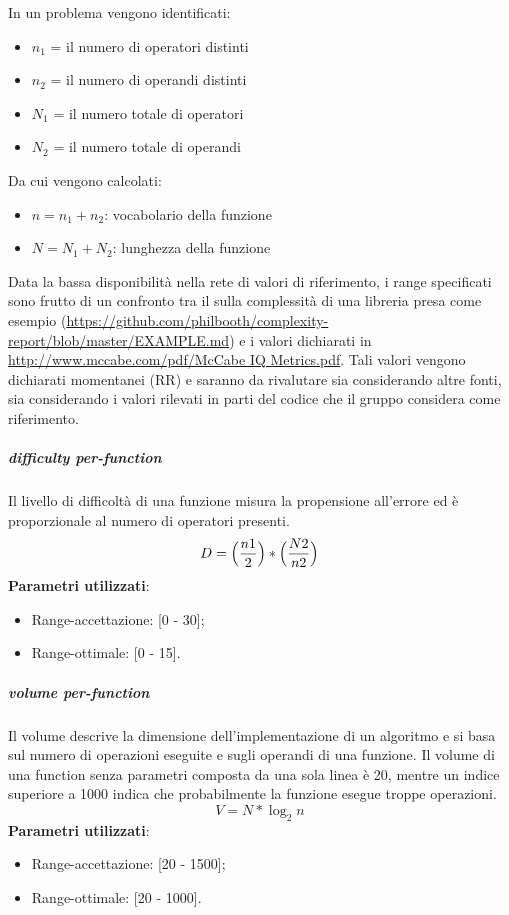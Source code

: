 			In un problema vengono identificati:
			\begin{itemize}
				\item $n_1$ = il numero di operatori distinti
				\item $n_2$ = il numero di operandi distinti
				\item $N_1$ = il numero totale di operatori
				\item $N_2$ = il numero totale di operandi
			\end{itemize}
			Da cui vengono calcolati:
				\begin{itemize}
				\item $n = n_1 + n_2$: vocabolario della funzione
				\item $N = N_1 + N_2$: lunghezza della funzione
			\end{itemize}
			Data la bassa disponibilità nella rete di valori di riferimento, i range specificati sono frutto di un confronto tra il  sulla complessità di una libreria  presa come esempio (\url{https://github.com/philbooth/complexity-report/blob/master/EXAMPLE.md}) e i valori dichiarati in \url{http://www.mccabe.com/pdf/McCabe IQ Metrics.pdf}. Tali valori vengono dichiarati momentanei (RR) e saranno da rivalutare sia considerando altre fonti, sia considerando i valori rilevati in parti del codice che il gruppo considera come riferimento. %

			
			\subparagraph{ difficulty per-function}
			Il livello di difficoltà di una funzione misura la propensione all'errore ed è proporzionale al numero di operatori presenti. 
			\[
			 D = \Bigl( \frac{n1}{2} \Bigr)  * \Bigl(  \frac{N2}{n2} \Bigr)
			 \]
			\textbf{Parametri utilizzati}:
			\begin{itemize}
				\item Range-accettazione: [0 - 30];
				\item Range-ottimale: [0 - 15].
			\end{itemize}
			
			\subparagraph{ volume per-function}
			Il volume descrive la dimensione dell'implementazione di un algoritmo e si basa sul numero di operazioni eseguite e sugli operandi di una funzione. Il volume di una function senza parametri composta da una sola linea è 20, mentre un indice superiore a 1000 indica che probabilmente la funzione esegue troppe operazioni.
			\[
			 V = N * \log_{2}n
			\]
			\textbf{Parametri utilizzati}:
			\begin{itemize}
				\item Range-accettazione: [20 - 1500];
				\item Range-ottimale: [20 - 1000].
			\end{itemize}

